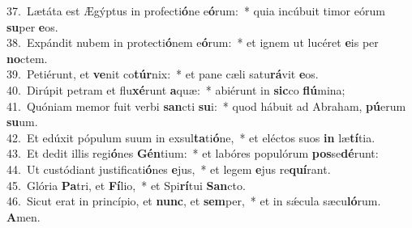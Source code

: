 {37.~}Lætáta est Ægýptus in profecti\textbf{ó}ne e\textbf{ó}rum:~* quia incúbuit timor eórum \textbf{su}per \textbf{e}os.\\
{38.~}Expándit nubem in protecti\textbf{ó}nem e\textbf{ó}rum:~* et ignem ut lucéret \textbf{e}is per \textbf{no}ctem.\\
{39.~}Petiérunt, et \textbf{ve}nit co\textbf{túr}nix:~* et pane cæli satu\textbf{rá}vit \textbf{e}os.\\
{40.~}Dirúpit petram et flu\textbf{xé}runt \textbf{a}quæ:~* abiérunt in \textbf{sic}co \textbf{flú}mina;\\
{41.~}Quóniam memor fuit verbi \textbf{san}cti \textbf{su}i:~* quod hábuit ad Abraham, \textbf{pú}erum \textbf{su}um.\\
{42.~}Et edúxit pópulum suum in exsul\textbf{ta}ti\textbf{ó}ne,~* et eléctos suos \textbf{in} læ\textbf{tí}tia.\\
{43.~}Et dedit illis regi\textbf{ó}nes \textbf{Gén}tium:~* et labóres populórum \textbf{pos}se\textbf{dé}runt:\\
{44.~}Ut custódiant justificati\textbf{ó}nes \textbf{e}jus,~* et legem \textbf{e}jus re\textbf{quí}rant.\\
{45.~}Glória \textbf{Pa}tri, et \textbf{Fí}lio,~* et Spi\textbf{rí}tui \textbf{San}cto.\\
{46.~}Sicut erat in princípio, et \textbf{nunc}, et \textbf{sem}per,~* et in sǽcula sæcu\textbf{ló}rum. \textbf{A}men.\\
